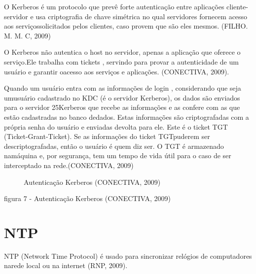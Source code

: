 O Kerberos é um protocolo que prevê forte autenticação entre aplicações cliente-servidor e usa criptografia de chave simétrica no qual servidores fornecem acesso aos serviçossolicitados pelos clientes, caso provem que são eles mesmos. (FILHO. M. M. C, 2009)

O Kerberos não autentica o host no servidor, apenas a aplicação que oferece o serviço.Ele trabalha com tickets , servindo para provar a autenticidade de um usuário e garantir oacesso aos serviços e aplicações. (CONECTIVA, 2009).

Quando um usuário entra com as informações de login , considerando que seja umusuário cadastrado no KDC (é o servidor Kerberos), os dados são enviados para o servidor 25Kerberos que recebe as informações e as confere com as que estão cadastradas no banco dedados. Estas informações são criptografadas com a própria senha do usuário e enviadas devolta para ele. Este é o ticket TGT (Ticket-Grant-Ticket). Se as informações do ticket TGTpuderem ser descriptografadas, então o usuário é quem diz ser. O TGT é armazenado namáquina e, por segurança, tem um tempo de vida útil para o caso de ser interceptado na rede.(CONECTIVA, 2009)

\begin{figure}[ht]
   	\centering
   	\caption{Autenticação Kerberos (CONECTIVA, 2009)}
    \label{kerberos}
\end{figure}
figura 7 - Autenticação Kerberos (CONECTIVA, 2009)

\section{NTP}

NTP (Network Time Protocol) é usado para sincronizar relógios de computadores narede local ou na internet (RNP, 2009).

